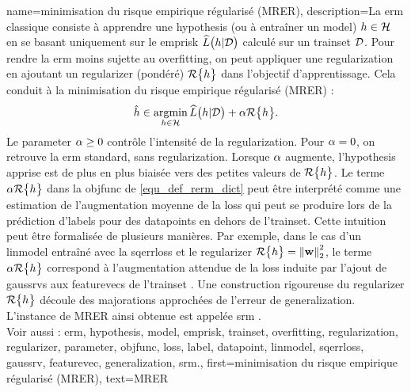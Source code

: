 {name={minimisation du risque empirique régularisé (MRER)}, 
	description={La \gls{erm} classique consiste à apprendre une \gls{hypothesis} (ou à entraîner un \gls{model}) $h \in \mathcal{H}$ en se basant uniquement sur le \gls{emprisk} $\widehat{L}\big(h|\mathcal{D}\big)$ calculé sur un \gls{trainset} $\mathcal{D}$. Pour rendre la \gls{erm} moins sujette au \gls{overfitting}, on peut appliquer une \gls{regularization} en ajoutant un \gls{regularizer} (pondéré) $\mathcal{R}\big\{ h \big\}$ dans l’objectif d’apprentissage. Cela conduit à la minimisation du risque empirique régularisé (MRER) :
		\begin{equation}
			\label{equ_def_rerm_dict}
			\hat{h} \in \operatorname*{argmin}_{h \in \mathcal{H}} \widehat{L}\big(h|\mathcal{D}\big) + \alpha \mathcal{R}\big\{ h \big\}.
		\end{equation}
		Le \gls{parameter} $\alpha \geq 0$ contrôle l’intensité de la \gls{regularization}. Pour $\alpha = 0$, on retrouve la \gls{erm} standard, sans \gls{regularization}. Lorsque $\alpha$ augmente, l’\gls{hypothesis} apprise est de plus en plus biaisée vers des petites valeurs de $\mathcal{R}\big\{ h \big\}$. Le terme $\alpha \mathcal{R}\big\{ h \big\}$ dans la \gls{objfunc} de \eqref{equ_def_rerm_dict} peut être interprété comme une estimation de l’augmentation moyenne de la \gls{loss} qui peut se produire lors de la prédiction d'\glspl{label} pour des \glspl{datapoint} en dehors de l'\gls{trainset}. Cette intuition peut être formalisée de plusieurs manières. Par exemple, dans le cas d’un \gls{linmodel} entraîné avec la \gls{sqerrloss} et le \gls{regularizer} $\regularizer{\hypothesis} = \normgeneric{\weights}{2}^{2}$, le terme $\alpha \mathcal{R}\big\{ h \big\}$ correspond à l’augmentation attendue de la \gls{loss} induite par l’ajout de \glspl{gaussrv} aux \glspl{featurevec} de l'\gls{trainset} \cite[Ch. 3]{MLBasics}. Une construction rigoureuse du \gls{regularizer} $\mathcal{R}\big\{ h \big\}$ découle des majorations approchées de l’erreur de \gls{generalization}. L’instance de MRER ainsi obtenue est appelée \gls{srm} \cite[Sec. 7.2]{ShalevShwartz2009}.
		\\
		Voir aussi : \gls{erm}, \gls{hypothesis}, \gls{model}, \gls{emprisk}, \gls{trainset}, \gls{overfitting}, \gls{regularization}, \gls{regularizer}, \gls{parameter}, \gls{objfunc}, \gls{loss}, \gls{label}, \gls{datapoint}, \gls{linmodel}, \gls{sqerrloss}, \gls{gaussrv}, \gls{featurevec}, \gls{generalization}, \gls{srm}.},
	first={minimisation du risque empirique régularisé (MRER)},
	text={MRER} 
}

